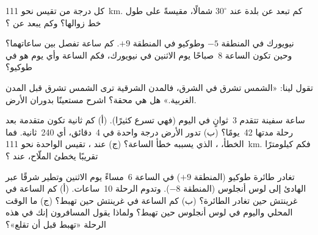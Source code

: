 \begin{exercise}[$\star\star$]\label{exo:g6:latitude-longitude:8}
كل درجة من  تقيس نحو \qty{111}{km}. كم تبعد عن
 بلدة عند $30^\circ$ شمالًا، مقيسةً على طول خط زوالها؟ وكم يبعد
 عن ؟
\end{exercise}

\begin{exercise}[$\star\star$]\label{exo:g6:latitude-longitude:9}
نيويورك في المنطقة $-5$ وطوكيو في المنطقة $+9$. كم ساعة تفصل
بين ساعاتهما؟ وحين تكون الساعة 8~صباحًا يوم الاثنين في نيويورك، فكم الساعة
وأي يوم هو في طوكيو؟
\end{exercise}

\begin{exercise}[$\star\star$]\label{exo:g6:latitude-longitude:10}
تقول لينا: «الشمس تشرق في الشرق، فالمدن الشرقية ترى
الشمس تشرق قبل المدن الغربية.» هل هي محقة؟ اشرح مستعينًا
بدوران الأرض.
\end{exercise}

\begin{exercise}[$\star\star\star$]\label{exo:g6:latitude-longitude:11}
ساعة سفينة تتقدم 3~ثوانٍ في اليوم (فهي تسرع كثيرًا). (أ) كم
ثانية تكون متقدمة بعد رحلة مدتها 42~يومًا؟ (ب) تدور الأرض
درجة واحدة في 4~دقائق، أي 240~ثانية. فما الخطأ، ، الذي يسببه خطأ الساعة؟ (ج) عند ، تقيس  الواحدة
نحو \qty{111}{km}. فكم كيلومترًا تقريبًا يخطئ
الملّاح، عند ؟
\end{exercise}

\begin{exercise}[$\star\star\star$]\label{exo:g6:latitude-longitude:12}
تغادر طائرة طوكيو (المنطقة $+9$) في الساعة 6~مساءً يوم الاثنين وتطير شرقًا عبر
 الهادئ إلى لوس أنجلوس (المنطقة $-8$). وتدوم الرحلة 10~ساعات. (أ) كم
الساعة في غرينتش حين تغادر الطائرة؟ (ب) كم الساعة في
غرينتش حين تهبط؟ (ج) ما الوقت المحلي واليوم في لوس
أنجلوس حين تهبط؟ ولماذا يقول المسافرون إنك في هذه الرحلة «تهبط
قبل أن تقلع»؟
\end{exercise}

